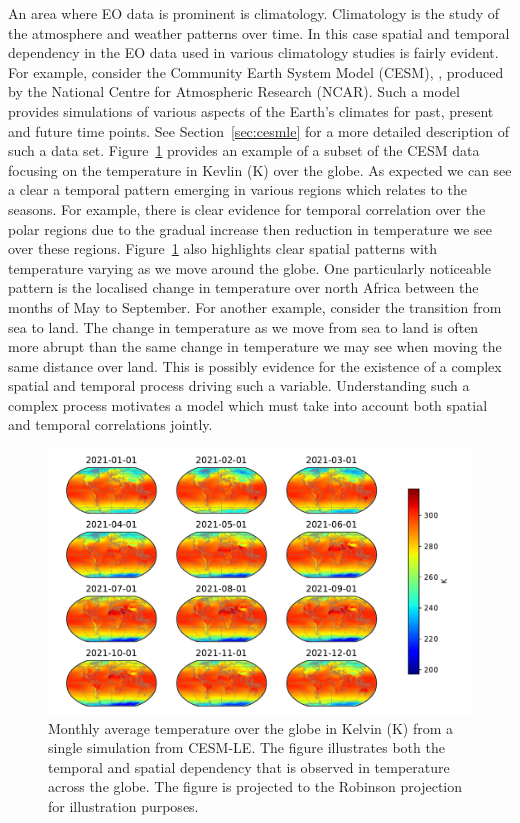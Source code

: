 An area where EO data is prominent is climatology.
Climatology is the study of the atmosphere and weather patterns over time.
In this case spatial and temporal dependency in the EO data used in various climatology studies is fairly evident.
For example, consider the Community Earth System Model (CESM), \citep{kay_community_2015}, produced by the National Centre for Atmospheric Research (NCAR).
Such a model provides simulations of various aspects of the Earth's climates for past, present and future time points.
See Section~\ref{sec:cesmle} for a more detailed description of such a data set.
Figure~\ref{fig:cesm_example} provides an example of a subset of the CESM data focusing on the temperature in Kevlin ($\si{\kelvin}$) over the globe.
As expected we can see a clear a temporal pattern emerging in various regions which relates to the seasons.
For example, there is clear evidence for temporal correlation over the polar regions due to the gradual increase then reduction in temperature we see over these regions.
Figure~\ref{fig:cesm_example} also highlights clear spatial patterns with temperature varying as we move around the globe.
One particularly noticeable pattern is the localised change in temperature over north Africa between the months of May to September.
For another example, consider the transition from sea to land.
The change in temperature as we move from sea to land is often more abrupt than the same change in temperature we may see when moving the same distance over land. 
This is possibly evidence for the existence of a complex spatial and temporal process driving such a variable.
Understanding such a complex process motivates a model which must take into account both spatial and temporal correlations jointly. 



\begin{figure}[htbp!] 
	\centering    
	\includegraphics[width=1.0\textwidth]{cesm_temp_example}
	\caption[Average monthly temperature from CESM-LE]{Monthly average temperature over the globe in Kelvin ($\si{\kelvin}$) from a single simulation from CESM-LE. The figure illustrates both the temporal and spatial dependency that is observed in temperature across the globe. The figure is projected to the Robinson projection for illustration purposes.}
	\label{fig:cesm_example}
\end{figure}

